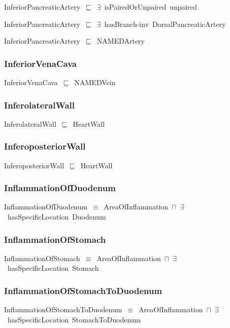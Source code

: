 \documentclass{article}
\begin{document}
InferiorPancreaticArtery~\ensuremath{\sqsubseteq}~\ensuremath{\exists}~isPairedOrUnpaired~unpaired~

InferiorPancreaticArtery~\ensuremath{\sqsubseteq}~\ensuremath{\exists}~hasBranch-inv~DorsalPancreaticArtery~

InferiorPancreaticArtery~\ensuremath{\sqsubseteq}~NAMEDArtery~

\subsubsection*{InferiorVenaCava}

InferiorVenaCava~\ensuremath{\sqsubseteq}~NAMEDVein~

\subsubsection*{InferolateralWall}

InferolateralWall~\ensuremath{\sqsubseteq}~HeartWall~

\subsubsection*{InferoposteriorWall}

InferoposteriorWall~\ensuremath{\sqsubseteq}~HeartWall~

\subsubsection*{InflammationOfDuodenum}

InflammationOfDuodenum~\ensuremath{\equiv}~AreaOfInflammation~\ensuremath{\sqcap}~\ensuremath{\exists}~hasSpecificLocation~Duodenum

\subsubsection*{InflammationOfStomach}

InflammationOfStomach~\ensuremath{\equiv}~AreaOfInflammation~\ensuremath{\sqcap}~\ensuremath{\exists}~hasSpecificLocation~Stomach

\subsubsection*{InflammationOfStomachToDuodenum}

InflammationOfStomachToDuodenum~\ensuremath{\equiv}~AreaOfInflammation~\ensuremath{\sqcap}~\ensuremath{\exists}~hasSpecificLocation~StomachToDuodenum
\end{document}
